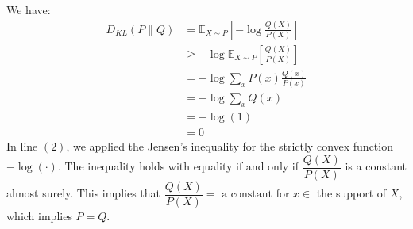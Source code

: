 \begin{answer}
We have:
\begin{align}
	D_{KL}(P\|Q)
	&= \mathbb{E}_{X \sim P} \left[ - \log \frac{Q(X)}{P(X)} \right] \\ 
	&\ge - \log \mathbb{E}_{X \sim P} \left[ \frac{Q(X)}{P(X)} \right] \\
	&= - \log \sum_x P(x) \frac{Q(x)}{P(x)} \\
	&= - \log \sum_x Q(x) \\
	&= - \log (1) \\
	&= 0
\end{align}
In line $(2)$, we applied the Jensen's inequality for the strictly convex function $- \log(\cdot)$. The inequality holds with equality  if and only if $\dfrac{Q(X)}{P(X)}$ is a constant almost surely. This implies that $\dfrac{Q(X)}{P(X)} = \text{ a constant}$ for $x \in$ the support of $X$, which implies $P = Q$. \\
\end{answer}
